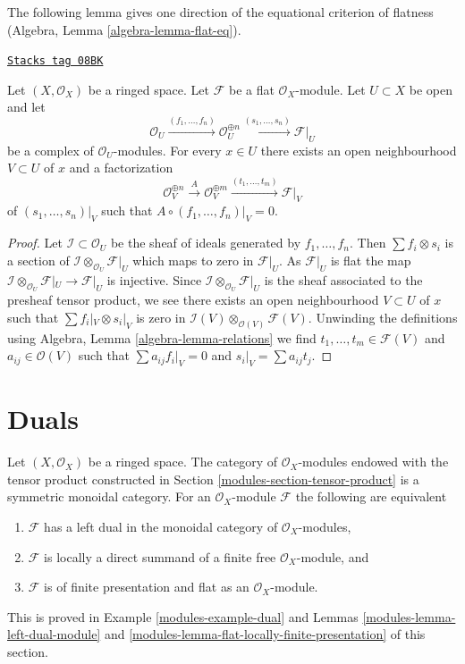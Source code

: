 The following lemma gives one direction of the equational criterion of
flatness (Algebra, Lemma \ref{algebra-lemma-flat-eq}).

\begin{lemma}[Flat eq]
\label{modules-lemma-flat-eq}
\href{https://stacks.math.columbia.edu/tag/08BK}{\texttt{Stacks tag 08BK}}

Let $(X, \mathcal{O}_X)$ be a ringed space. Let $\mathcal{F}$ be a flat
$\mathcal{O}_X$-module. Let $U \subset X$ be open and let
$$
\mathcal{O}_U \xrightarrow{(f_1, \ldots, f_n)}
\mathcal{O}_U^{\oplus n} \xrightarrow{(s_1, \ldots, s_n)}
\mathcal{F}|_U
$$
be a complex of $\mathcal{O}_U$-modules. For every $x \in U$ there
exists an open neighbourhood $V \subset U$ of $x$ and a factorization
$$
\mathcal{O}_V^{\oplus n}
\xrightarrow{A}
\mathcal{O}_V^{\oplus m} \xrightarrow{(t_1, \ldots, t_m)}
\mathcal{F}|_V
$$
of $(s_1, \ldots, s_n)|_V$ such that $A \circ (f_1, \ldots, f_n)|_V = 0$.
\end{lemma}

\begin{proof}
Let $\mathcal{I} \subset \mathcal{O}_U$ be the sheaf of ideals
generated by $f_1, \ldots, f_n$. Then $\sum f_i \otimes s_i$ is
a section of $\mathcal{I} \otimes_{\mathcal{O}_U} \mathcal{F}|_U$
which maps to zero in $\mathcal{F}|_U$. As $\mathcal{F}|_U$ is flat
the map
$\mathcal{I} \otimes_{\mathcal{O}_U} \mathcal{F}|_U \to \mathcal{F}|_U$
is injective. Since $\mathcal{I} \otimes_{\mathcal{O}_U} \mathcal{F}|_U$
is the sheaf associated to the presheaf tensor product, we see
there exists an open neighbourhood $V \subset U$ of $x$ such
that $\sum f_i|_V \otimes s_i|_V$ is zero in
$\mathcal{I}(V) \otimes_{\mathcal{O}(V)} \mathcal{F}(V)$.
Unwinding the definitions using Algebra, Lemma \ref{algebra-lemma-relations}
we find $t_1, \ldots, t_m \in \mathcal{F}(V)$ and $a_{ij} \in \mathcal{O}(V)$
such that $\sum a_{ij}f_i|_V = 0$ and $s_i|_V = \sum a_{ij}t_j$.
\end{proof}

\section{Duals}
\label{modules-section-duals}
Let $(X, \mathcal{O}_X)$ be a ringed space. The category of
$\mathcal{O}_X$-modules endowed with the tensor product
constructed in Section \ref{modules-section-tensor-product}
is a symmetric monoidal category. For an $\mathcal{O}_X$-module
$\mathcal{F}$ the following are equivalent
\begin{enumerate}
\item $\mathcal{F}$ has a left dual in the monoidal category
of $\mathcal{O}_X$-modules,
\item $\mathcal{F}$ is locally a direct summand of a finite
free $\mathcal{O}_X$-module, and
\item $\mathcal{F}$ is of finite presentation and flat as an
$\mathcal{O}_X$-module.
\end{enumerate}
This is proved in Example \ref{modules-example-dual} and
Lemmas \ref{modules-lemma-left-dual-module} and
\ref{modules-lemma-flat-locally-finite-presentation} of this section.

